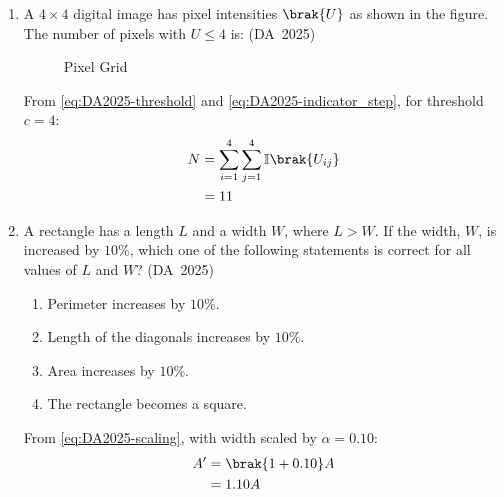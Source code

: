 \begin{enumerate}[label=\thesubsection.\arabic*, ref=\thesubsection.\theenumi]
	
	\item 
	A $4 \times 4$ digital image has pixel intensities $\brak{U}$ as shown in the figure. The number of pixels with $U \le 4$ is:
	\hfill (DA~2025)
	\begin{figure}[H]
		\centering
		
		\caption{Pixel Grid}
		\label{fig:DA-2025-3}
	\end{figure}
	\begin{enumerate}
	\end{enumerate}
	\solution
	From \eqref{eq:DA2025-threshold} and \eqref{eq:DA2025-indicator_step}, for threshold $c = 4$:
	\begin{align}
		N &= \sum_{i=1}^4 \sum_{j=1}^4 \mathbb{I}\brak{U_{ij}}
		\\
		&= 11
	\end{align}
	
	\item 
	A rectangle has a length $L$ and a width $W$, where $L > W$. If the width, $W$, is increased by $10\%$, which one of the following statements is correct for all values of $L$ and $W$?
	\hfill (DA~2025)
	\begin{enumerate}
		\item Perimeter increases by $10\%$.
		\item Length of the diagonals increases by $10\%$.
		\item Area increases by $10\%$.
		\item The rectangle becomes a square.
	\end{enumerate}
	\solution
	From \eqref{eq:DA2025-scaling}, with width scaled by $\alpha = 0.10$:
	\begin{align}
		A' &= \brak{1 + 0.10}A
		\\
		&= 1.10A
	\end{align}
	

\end{enumerate}
